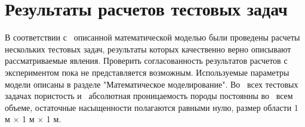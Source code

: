%
\section{Результаты расчетов тестовых задач}
%
В соответствии с~ описанной математической моделью были проведены расчеты
нескольких тестовых задач, результаты которых качественно верно описывают
рассматриваемые явления. Проверить согласованность результатов расчетов с~
экспериментом пока не представляется возможным. 
Используемые параметры модели описаны
в разделе "Математическое моделирование". Во~ всех тестовых задачах
пористость и~ абсолютная проницаемость породы постоянны во~ всем объеме,
остаточные насыщенности полагаются равными нулю, размер области 1 м $\times$ 1 м $\times$ 1 м.